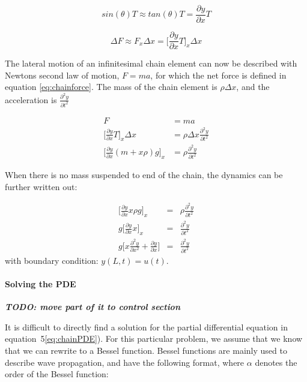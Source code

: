 \begin{equation}
\label{eq:chainapprox}
sin(\theta)T \approx tan(\theta)T = \frac{\partial y}{\partial x}T
\end{equation}

\begin{equation}
\label{eq:chainforce}
\Delta F \approx F_x \Delta x = \big[\frac{\partial y}{\partial x}T\big]_x \Delta x
\end{equation}

The lateral motion of an infinitesimal chain element can now be described with Newtons second law of motion, $F = ma$, for which the net force is defined in equation \ref{eq:chainforce}. The mass of the chain element is $\rho \Delta x$, and the acceleration is $\frac{\partial^2 y}{\partial t^2}$

\begin{equation}
\begin{aligned}
    F &= ma \\
    \big[\frac{\partial y}{\partial x}T\big]_x \Delta x &= \rho \Delta x \frac{\partial^2 y}{\partial t^2} \\
    \big[\frac{\partial y}{\partial x} (m + x\rho)g \big]_x &= \rho \frac{\partial^2 y}{\partial t^2}
\end{aligned}
\end{equation}

When there is no mass suspended to end of the chain, the dynamics can be further written out:

\begin{eqnarray}
\label{eq:chainPDE}
    \big[\frac{\partial y}{\partial x} x \rho g \big]_x &=& \rho \frac{\partial^2 y}{\partial t^2} \\
    g \big[\frac{\partial y}{\partial x} x \big]_x &=& \frac{\partial^2 y}{\partial t^2} \\
    g \big[x \frac{\partial^2 y}{\partial x^2} + \frac{\partial y}{\partial x} \big] &=& \frac{\partial^2 y}{\partial t^2}
\end{eqnarray}
with boundary condition: $y(L,t) = u(t) $.


\paragraph{Solving the PDE}
\bigskip
\emph{\textbf{TODO: move part of it to control section
}}\bigskip

It is difficult to directly find a solution for the partial differential equation in equation~5\ref{eq:chainPDE}). For this particular problem, we assume that we know that we can rewrite to a Bessel function. Bessel functions are mainly used to describe wave propagation, and have the following format, where $\alpha$ denotes the order of the Bessel function:

